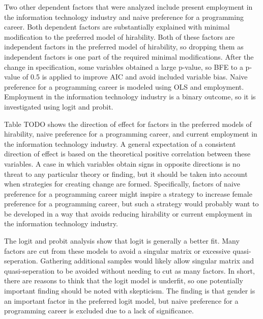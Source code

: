\documentclass[review]{elsarticle}
\begin{document}
Two other dependent factors that were analyzed include present employment in the information technology industry
and naive preference for a programming career.
Both dependent factors are substantially explained with minimal modification to the preferred model of hirability.
Both of these factors are independent factors in the preferred model of hirability,
so dropping them as independent factors is one part of the required minimal modifications.
After the change in specification, some variables obtained a large p-value, so BFE to a p-value of 0.5 is applied
to improve AIC and avoid included variable bias.
Naive preference for a programming career is modeled using OLS and employment.
Employment in the information technology industry is a binary outcome, so it is investigated using logit and probit.

Table TODO shows the direction of effect for factors in the preferred models of hirability,
naive preference for a programming career,
and current employment in the information technology industry.
A general expectation of a consistent direction of effect is based on the theoretical positive correlation between these variables.
A case in which variables obtain signs in opposite directions is no threat to any particular theory or finding,
but it should be taken into account when strategies for creating change are formed.
Specifically, factors of naive preference for a programming career
might inspire a strategy to increase female preference for a programming career,
but such a strategy would probably want to be developed in a way that avoids reducing hirability or current employment in the information technology industry.

The logit and probit analysis show that logit is generally a better fit.
Many factors are cut from these models to avoid a singular matrix or excessive quasi-seperation.
Gathering additional samples would likely allow singular matrix and quasi-seperation to be avoided
without needing to cut as many factors.
In short, there are reasons to think that the logit model is underfit,
so one potentially important finding should be noted with skepticism.
The finding is that gender is an important factor in the preferred logit model,
but naive preference for a programming career is excluded due to a lack of significance.
\end{document}
